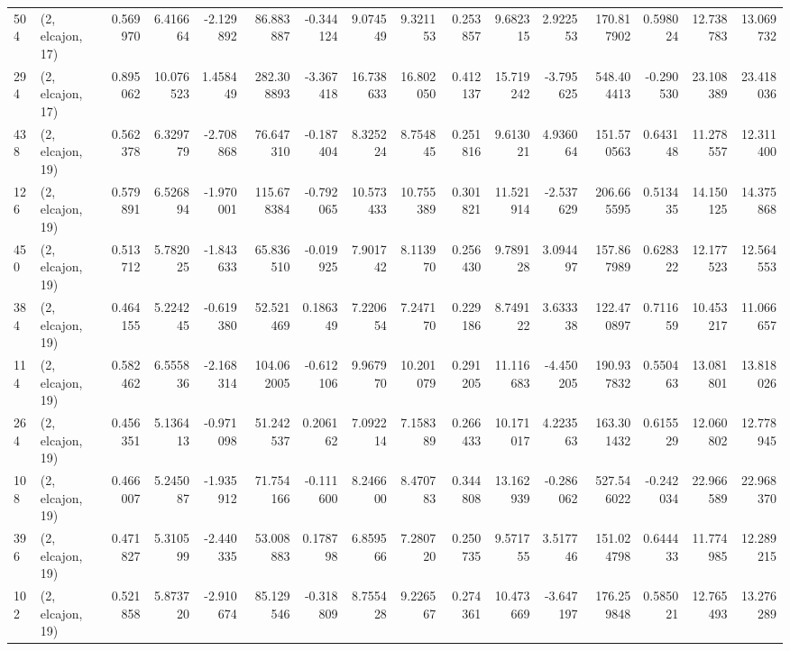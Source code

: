 \begin{tabular}{llrrrrrrrrrrrrrr}
504 &  (2, elcajon, 17) &   0.569970 &   6.416664 &  -2.129892 &    86.883887 &  -0.344124 &   9.074549 &   9.321153 &  0.253857 &   9.682315 &   2.922553 &   170.817902 &  0.598024 &  12.738783 &  13.069732 \\
294 &  (2, elcajon, 17) &   0.895062 &  10.076523 &   1.458449 &   282.308893 &  -3.367418 &  16.738633 &  16.802050 &  0.412137 &  15.719242 &  -3.795625 &   548.404413 & -0.290530 &  23.108389 &  23.418036 \\
438 &  (2, elcajon, 19) &   0.562378 &   6.329779 &  -2.708868 &    76.647310 &  -0.187404 &   8.325224 &   8.754845 &  0.251816 &   9.613021 &   4.936064 &   151.570563 &  0.643148 &  11.278557 &  12.311400 \\
126 &  (2, elcajon, 19) &   0.579891 &   6.526894 &  -1.970001 &   115.678384 &  -0.792065 &  10.573433 &  10.755389 &  0.301821 &  11.521914 &  -2.537629 &   206.665595 &  0.513435 &  14.150125 &  14.375868 \\
450 &  (2, elcajon, 19) &   0.513712 &   5.782025 &  -1.843633 &    65.836510 &  -0.019925 &   7.901742 &   8.113970 &  0.256430 &   9.789128 &   3.094497 &   157.867989 &  0.628322 &  12.177523 &  12.564553 \\
384 &  (2, elcajon, 19) &   0.464155 &   5.224245 &  -0.619380 &    52.521469 &   0.186349 &   7.220654 &   7.247170 &  0.229186 &   8.749122 &   3.633338 &   122.470897 &  0.711659 &  10.453217 &  11.066657 \\
114 &  (2, elcajon, 19) &   0.582462 &   6.555836 &  -2.168314 &   104.062005 &  -0.612106 &   9.967970 &  10.201079 &  0.291205 &  11.116683 &  -4.450205 &   190.937832 &  0.550463 &  13.081801 &  13.818026 \\
264 &  (2, elcajon, 19) &   0.456351 &   5.136413 &  -0.971098 &    51.242537 &   0.206162 &   7.092214 &   7.158389 &  0.266433 &  10.171017 &   4.223563 &   163.301432 &  0.615529 &  12.060802 &  12.778945 \\
108 &  (2, elcajon, 19) &   0.466007 &   5.245087 &  -1.935912 &    71.754166 &  -0.111600 &   8.246600 &   8.470783 &  0.344808 &  13.162939 &  -0.286062 &   527.546022 & -0.242034 &  22.966589 &  22.968370 \\
396 &  (2, elcajon, 19) &   0.471827 &   5.310599 &  -2.440335 &    53.008883 &   0.178798 &   6.859566 &   7.280720 &  0.250735 &   9.571755 &   3.517746 &   151.024798 &  0.644433 &  11.774985 &  12.289215 \\
102 &  (2, elcajon, 19) &   0.521858 &   5.873720 &  -2.910674 &    85.129546 &  -0.318809 &   8.755428 &   9.226567 &  0.274361 &  10.473669 &  -3.647197 &   176.259848 &  0.585021 &  12.765493 &  13.276289 \\

\end{tabular}
